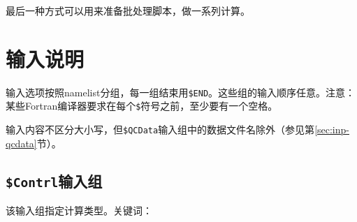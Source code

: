 \documentclass[12pt,a4paper,openany,twoside,cap,UTF8]{ctexbook}
\begin{document}
最后一种方式可以用来准备批处理脚本，做一系列计算。


\chapter{输入说明} \label{part:input}

输入选项按照namelist分组，每一组结束用\verb|$END|。这些组的输入顺序任意。注意：某些Fortran编译器要求在每个\verb|$|符号之前，至少要有一个空格。

输入内容不区分大小写，但\verb|$QCData|输入组中的数据文件名除外（参见第\ref{sec:inp-qcdata}节）。

\section{\texttt{\$Contrl}输入组} \label{sec:inp-contrl}

该输入组指定计算类型。关键词：
\end{document}
